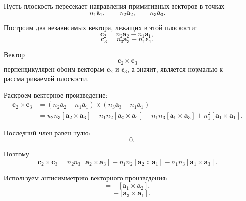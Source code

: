 \documentclass[../final.tex]{subfiles}
\begin{document}
Пусть плоскость пересекает направления примитивных векторов
в точках
%
\begin{equation*}
    n_1\mathbf a_1,
    \qquad
    n_2\mathbf a_2,
    \qquad
    n_3\mathbf a_3.
\end{equation*}

Построим два независимых вектора, лежащих в этой плоскости:
%
\begin{equation*}
    \boxed{
        \mathbf c_2
        =
        n_2\mathbf a_2
        -
        n_1\mathbf a_1
    },
\end{equation*}
%
\begin{equation*}
    \boxed{
        \mathbf c_3
        =
        n_3\mathbf a_3
        -
        n_1\mathbf a_1
    }.
\end{equation*}

Вектор
%
\begin{equation*}
    \mathbf c_2\times\mathbf c_3
\end{equation*}
%
перпендикулярен обоим векторам $\mathbf c_2$ и $\mathbf c_3$,
а значит, является нормалью к рассматриваемой плоскости.

Раскроем векторное произведение:
%
\begin{align*}
    \mathbf c_2\times\mathbf c_3
    &=
    \left(
        n_2\mathbf a_2-n_1\mathbf a_1
    \right)
    \times
    \left(
        n_3\mathbf a_3-n_1\mathbf a_1
    \right)
    \\
    &=
    n_2n_3
    [\mathbf a_2\times\mathbf a_3]
    -
    n_1n_2
    [\mathbf a_2\times\mathbf a_1]
    -
    n_1n_3
    [\mathbf a_1\times\mathbf a_3]
    +
    n_1^2
    [\mathbf a_1\times\mathbf a_1].
\end{align*}

Последний член равен нулю:
%
\begin{equation*}
    [\mathbf a_1\times\mathbf a_1]=0.
\end{equation*}

Поэтому
%
\begin{equation*}
    \mathbf c_2\times\mathbf c_3
    =
    n_2n_3
    [\mathbf a_2\times\mathbf a_3]
    -
    n_1n_2
    [\mathbf a_2\times\mathbf a_1]
    -
    n_1n_3
    [\mathbf a_1\times\mathbf a_3].
\end{equation*}

Используем антисимметрию векторного произведения:
%
\begin{equation*}
    [\mathbf a_2\times\mathbf a_1]
    =
    -[\mathbf a_1\times\mathbf a_2],
\end{equation*}
%
\begin{equation*}
    [\mathbf a_1\times\mathbf a_3]
    =
    -[\mathbf a_3\times\mathbf a_1].
\end{equation*}
\end{document}
